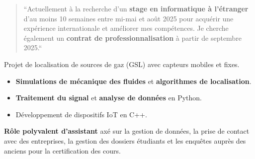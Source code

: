 \documentclass[10pt,a4paper,ragged2e,withhyper]{../AltaCV/altacv}
\begin{document}



\makecvheader


\begin{paracol}{2}

  \begin{quote}
    ``Actuellement à la recherche d'un \textbf{stage en informatique à l'étranger} d'au moins 10 semaines entre mi-mai et août 2025 pour acquérir une expérience internationale et améliorer mes compétences.
    Je cherche également un \textbf{contrat de professionnalisation} à partir de septembre 2025.``
  \end{quote}


  Projet de localisation de sources de gaz (GSL) avec capteurs mobiles et fixes.

\begin{itemize}
  \item \textbf{Simulations de mécanique des fluides} et \textbf{algorithmes de localisation}.
  \item \textbf{Traitement du signal} et \textbf{analyse de données} en Python.
  \item Développement de dispositifs IoT en C++.
\end{itemize}
  \divider


  \textbf{Rôle polyvalent d'assistant} axé sur la gestion de données, la prise de contact avec des entreprises, la gestion des dossiers étudiants et les enquêtes auprès des anciens pour la certification des cours.

  \divider



\end{paracol}
\end{document}

